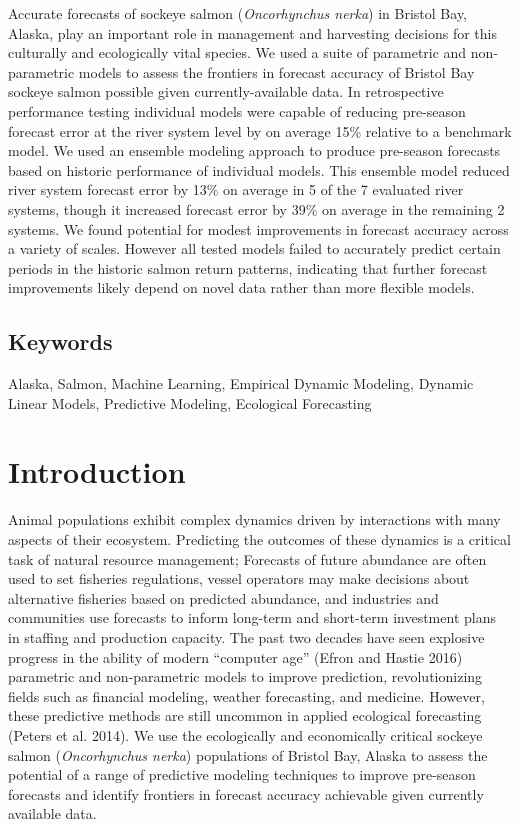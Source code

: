 \documentclass[
]{article}
\begin{document}
Accurate forecasts of sockeye salmon (\emph{Oncorhynchus nerka}) in Bristol Bay, Alaska, play an important role in management and harvesting decisions for this culturally and ecologically vital species. We used a suite of parametric and non-parametric models to assess the frontiers in forecast accuracy of Bristol Bay sockeye salmon possible given currently-available data. In retrospective performance testing individual models were capable of reducing pre-season forecast error at the river system level by on average 15\% relative to a benchmark model. We used an ensemble modeling approach to produce pre-season forecasts based on historic performance of individual models. This ensemble model reduced river system forecast error by 13\% on average in 5 of the 7 evaluated river systems, though it increased forecast error by 39\% on average in the remaining 2 systems. We found potential for modest improvements in forecast accuracy across a variety of scales. However all tested models failed to accurately predict certain periods in the historic salmon return patterns, indicating that further forecast improvements likely depend on novel data rather than more flexible models.

\hypertarget{keywords}{%
\subsection*{Keywords}\label{keywords}}

Alaska, Salmon, Machine Learning, Empirical Dynamic Modeling, Dynamic Linear Models, Predictive Modeling, Ecological Forecasting

\newpage

\hypertarget{introduction}{%
\section{Introduction}\label{introduction}}

Animal populations exhibit complex dynamics driven by interactions with many aspects of their ecosystem. Predicting the outcomes of these dynamics is a critical task of natural resource management; Forecasts of future abundance are often used to set fisheries regulations, vessel operators may make decisions about alternative fisheries based on predicted abundance, and industries and communities use forecasts to inform long-term and short-term investment plans in staffing and production capacity. The past two decades have seen explosive progress in the ability of modern ``computer age'' (Efron and Hastie 2016) parametric and non-parametric models to improve prediction, revolutionizing fields such as financial modeling, weather forecasting, and medicine. However, these predictive methods are still uncommon in applied ecological forecasting (Peters et al. 2014). We use the ecologically and economically critical sockeye salmon (\emph{Oncorhynchus nerka}) populations of Bristol Bay, Alaska to assess the potential of a range of predictive modeling techniques to improve pre-season forecasts and identify frontiers in forecast accuracy achievable given currently available data.
\end{document}
